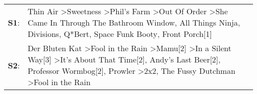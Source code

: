 \begin{supertabular}{p{0.03\textwidth}p{0.92\textwidth}}
 \textbf{S1}:  &                                                                            Thin Air\textsuperscript{} \textgreater \enspace Sweetness\textsuperscript{} \textgreater \enspace Phil's Farm\textsuperscript{} \textgreater \enspace Out Of Order\textsuperscript{} \textgreater \enspace She Came In Through The Bathroom Window\textsuperscript{}, \enspace All Things Ninja\textsuperscript{}, \enspace Divisions\textsuperscript{}, \enspace Q*Bert\textsuperscript{}, \enspace Space Funk Booty\textsuperscript{}, \enspace Front Porch[1]\textsuperscript{}  \enspace  \\
 \textbf{S2}:  &  Der Bluten Kat\textsuperscript{} \textgreater \enspace Fool in the Rain\textsuperscript{} \textgreater \enspace Mamu[2]\textsuperscript{} \textgreater \enspace In a Silent Way[3]\textsuperscript{} \textgreater \enspace It's About That Time[2]\textsuperscript{}, \enspace Andy's Last Beer[2]\textsuperscript{}, \enspace Professor Wormbog[2]\textsuperscript{}, \enspace Prowler\textsuperscript{} \textgreater \enspace 2x2\textsuperscript{}, \enspace The Fussy Dutchman\textsuperscript{} \textgreater \enspace Fool in the Rain\textsuperscript{}  \enspace  \\
\end{supertabular}

